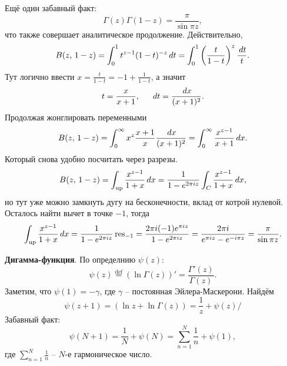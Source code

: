 Ещё один забавный факт:
\begin{equation*}
    \Gamma(z) \Gamma(1-z) = \frac{\pi}{\sin \pi z},
\end{equation*}
что также совершает аналитическое продолжение. Действительно,
\begin{equation*}
    B(z,\, 1-z) = \int_{0}^{1}  t^{z-1} (1-t)^{-z} \, d t = \int_0^1 \left(\frac{t}{1-t}\right)^z \frac{\, d t}{t}.
\end{equation*}
Тут логично ввести $x = \frac{t}{1-t} = -1 + \frac{1}{1-t}$, а значит
\begin{equation*}
    t = \frac{x}{x+1}, \hspace{5 mm} 
    \, d t = \frac{\, d x}{(x+1)^2}.
\end{equation*}
Продолжая жонглировать переменными
\begin{equation*}
    B(z,\, 1-z) = \int_{0}^{\infty} x^z \frac{x+1}{x} \frac{\, d x}{(x + 1)^2} = 
    \int_{0}^{\infty} \frac{x^{z-1}}{x+1} \, d x.
\end{equation*}
Который снова удобно посчитать через разрезы. 
\begin{equation*}
    B(z,\, 1-z) = \int_{\text{up}} \frac{x^{z-1}}{1+x} \, d x =
    \frac{1}{1-e^{2 \pi i z}} \int_C \frac{x^{z-1}}{1+x} \, d x,
\end{equation*}
но тут уже можно замкнуть дугу на бесконечности, вклад от котрой нулевой.  Осталось найти вычет в точке $-1$, тогда
\begin{equation*}
    \int_{\text{up}} \frac{x^{z-1}}{1+x} \, d x = \frac{1}{1-e^{2\pi i z}}    \mathop{\mathrm{res}}\nolimits_{-1} = \frac{2 \pi i (-1) e^{\pi i z}}{1 - e^{2 \pi i z}} = \frac{2 \pi i}{e^{\pi i z} - e^{-i \pi z}} = \frac{\pi}{\sin \pi z}.
\end{equation*}

\textbf{Дигамма-функция}. По определнию $\psi(z)$:
\begin{equation*}
    \psi(z) \overset{\mathrm{def}}{=}  \left(\ln \Gamma(z)\right)' = \frac{\Gamma'(z)}{\Gamma(z)}.
\end{equation*}
Заметим, что $\psi(1) = - \gamma$, где $\gamma$ -- постоянная Эйлера-Маскерони. Найдём
\begin{equation*}
    \psi(z+1)= \left(\ln z + \ln \Gamma(z)\right) = \frac{1}{z} + \psi(z)/
\end{equation*}
Забавный факт:
\begin{equation*}
    \psi(N+1) = \frac{1}{N} + \psi(N) = \sum_{n=1}^{N} \frac{1}{n} + \psi(1),
\end{equation*}
где $\sum_{n=1}^{N} \frac{1}{n}$ -- $N$-е гармоническое число. 


